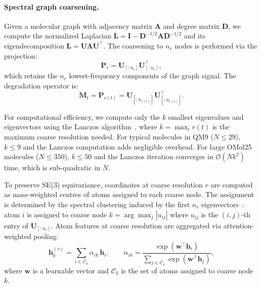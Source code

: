 \documentclass[11pt]{article}
\newcommand{\mM}{\mathbf{M}}
\newcommand{\mL}{\mathbf{L}}
\newcommand{\mI}{\mathbf{I}}
\newcommand{\mP}{\mathbf{P}}
\newcommand{\mU}{\mathbf{U}}
\newcommand{\mLambda}{\boldsymbol{\Lambda}}
\begin{document}
\paragraph{Spectral graph coarsening.}
Given a molecular graph with adjacency matrix $\mathbf{A}$ and degree matrix $\mathbf{D}$, we compute the normalized Laplacian $\mL = \mI - \mathbf{D}^{-1/2}\mathbf{A}\mathbf{D}^{-1/2}$ and its eigendecomposition $\mL = \mU\mLambda\mU^\top$. The coarsening to $n_r$ nodes is performed via the projection:
\begin{equation}
    \mP_r = \mU_{[:n_r]}\mU_{[:n_r]}^\top,
\end{equation}
which retains the $n_r$ lowest-frequency components of the graph signal. The degradation operator is:
\begin{equation}
    \mM_t = \mP_{r(t)} = \mU_{[:n_{r(t)}]}\mU_{[:n_{r(t)}]}^\top.
\end{equation}

For computational efficiency, we compute only the $k$ smallest eigenvalues and eigenvectors using the Lanczos algorithm~\cite{lanczos1950iteration}, where $k = \max_{t} r(t)$ is the maximum coarse resolution needed. For typical molecules in QM9 ($N \leq 29$), $k \leq 9$ and the Lanczos computation adds negligible overhead. For large OMol25 molecules ($N \leq 350$), $k \leq 50$ and the Lanczos iteration converges in $\mathcal{O}(Nk^2)$ time, which is sub-quadratic in $N$.

To preserve SE(3) equivariance, coordinates at coarse resolution $r$ are computed as mass-weighted centres of atoms assigned to each coarse node. The assignment is determined by the spectral clustering induced by the first $n_r$ eigenvectors~\cite{vonluxburg2007spectral}: atom $i$ is assigned to coarse node $k = \arg\max_j |u_{ij}|$ where $u_{ij}$ is the $(i,j)$-th entry of $\mU_{[:n_r]}$. Atom features at coarse resolution are aggregated via attention-weighted pooling:
\begin{equation}
    \mathbf{h}_k^{(r)} = \sum_{i \in \mathcal{C}_k} \alpha_{ik}\, \mathbf{h}_i, \qquad \alpha_{ik} = \frac{\exp(\mathbf{w}^\top \mathbf{h}_i)}{\sum_{j \in \mathcal{C}_k} \exp(\mathbf{w}^\top \mathbf{h}_j)},
\end{equation}
where $\mathbf{w}$ is a learnable vector and $\mathcal{C}_k$ is the set of atoms assigned to coarse node $k$.
\end{document}
